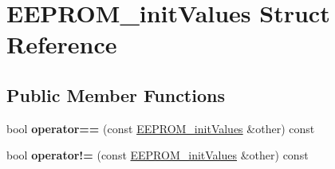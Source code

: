 \hypertarget{struct_e_e_p_r_o_m__init_values}{}\section{E\+E\+P\+R\+O\+M\+\_\+init\+Values Struct Reference}
\label{struct_e_e_p_r_o_m__init_values}
\subsection*{Public Member Functions}
\begin{DoxyCompactItemize}
\item 
\mbox{\label{struct_e_e_p_r_o_m__init_values_a748563277e8538863ca85d1beff7243a}} 
bool {\bfseries operator==} (const \hyperlink{struct_e_e_p_r_o_m__init_values}{E\+E\+P\+R\+O\+M\+\_\+init\+Values} \&other) const
\item 
\mbox{\label{struct_e_e_p_r_o_m__init_values_ae65906bf28d8c8f8bab8243d460c8175}} 
bool {\bfseries operator!=} (const \hyperlink{struct_e_e_p_r_o_m__init_values}{E\+E\+P\+R\+O\+M\+\_\+init\+Values} \&other) const
\end{DoxyCompactItemize}

